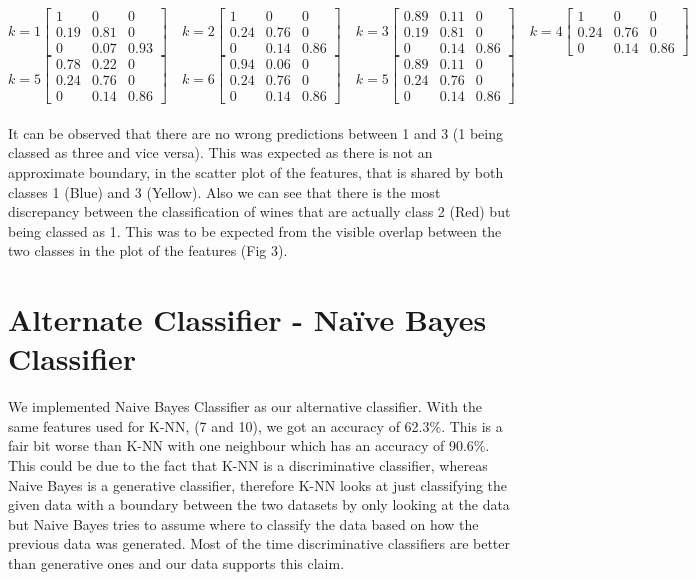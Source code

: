 \documentclass[11pt]{article}
\begin{document}
$$
k=1
\begin{bmatrix} 
1 & 0 & 0\\
0.19 & 0.81 & 0\\
0 & 0.07 & 0.93
\end{bmatrix}
\quad
k=2
\begin{bmatrix} 
1 & 0 & 0\\
0.24 & 0.76 & 0\\
0 & 0.14 & 0.86
\end{bmatrix}
\quad
k=3
\begin{bmatrix} 
0.89 & 0.11 & 0\\
0.19 & 0.81 & 0\\
0 & 0.14 & 0.86
\end{bmatrix}
\quad
k=4
\begin{bmatrix} 
1 & 0 & 0\\
0.24 & 0.76 & 0\\
0 & 0.14 & 0.86
\end{bmatrix}
$$
$$
k=5
\begin{bmatrix} 
0.78 & 0.22 & 0\\
0.24 & 0.76 & 0\\
0 & 0.14 & 0.86
\end{bmatrix}
\quad
k=6
\begin{bmatrix} 
0.94 & 0.06 & 0\\
0.24 & 0.76 & 0\\
0 & 0.14 & 0.86
\end{bmatrix}
\quad
k=5
\begin{bmatrix} 
0.89 & 0.11 & 0\\
0.24 & 0.76 & 0\\
0 & 0.14 & 0.86
\end{bmatrix}
\quad
$$
\\
\noindent
It can be observed that there are no wrong predictions between 1 and 3 (1 being classed as three and vice versa). This was expected as there is not an approximate boundary, in the scatter plot of the features, that is shared by both classes 1 (Blue) and 3 (Yellow). Also we can see that there is the most discrepancy between the classification of wines that are actually class 2 (Red) but being classed as 1. This was to be expected from the visible overlap between the two classes in the plot of the features (Fig 3).

\section*{Alternate Classifier - Na\"ive Bayes Classifier}
We implemented Naive Bayes Classifier as our alternative classifier. With the same features used for K-NN, (7 and 10), we got an accuracy of 62.3\%. This is a fair bit worse than K-NN with one neighbour which has an accuracy of 90.6\%. This could be due to the fact that K-NN is a discriminative classifier, whereas Naive Bayes is a generative classifier, therefore K-NN looks at just classifying the given data with a boundary between the two datasets by only looking at the data but Naive Bayes tries to assume where to classify the data based on how the previous data was generated. Most of the time discriminative classifiers are better than generative ones and our data supports this claim.\\
\end{document}
